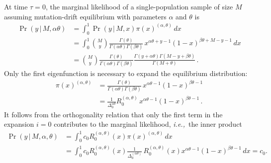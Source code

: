 \documentclass[preprint]{elsarticle}
\newcommand\given{{\,|\,}}
\newcommand\ie{{\it i.e.,}}
\begin{document}
At time $\tau=0$, the marginal likelihood of a single-population sample of size $M$ assuming mutation-drift equilibrium with parameters $\alpha$ and $\theta$ is
\begin{equation}
\begin{split}
    \Pr(y\given M,\alpha\theta)
    &=\int_0^1 \Pr(y\given M,x) \pi(x)^{(\alpha,\theta)}\,dx\\
    &=\int_0^1 \binom{M}{y}\frac{\Gamma(\theta)}{\Gamma(\alpha\theta)\Gamma(\beta\theta)}\,x^{\alpha\theta+y-1}(1-x)^{\beta\theta+M-y-1}\,dx\\
    &=\binom{M}{y}\frac{\Gamma(\theta)}{\Gamma(\alpha\theta)\Gamma(\beta\theta)}
    \frac{\Gamma(y+\alpha\theta)\Gamma(M-y+\beta\theta)}{\Gamma(M+\theta)}\,.
\end{split}
\end{equation}
Only the first eigenfunction is necessary to expand the equilibrium distribution:
\begin{equation}
\begin{split}
    \pi(x)^{(\alpha,\theta)}&=\frac{\Gamma(\theta)}{\Gamma(\alpha\theta)\Gamma(\beta\theta)}\,x^{\alpha\theta-1}(1-x)^{\beta\theta-1}\\
    &=\frac{1}{\Delta_0^{\alpha\theta}}R_0^{(\alpha,\theta)}\,x^{\alpha\theta-1}(1-x)^{\beta\theta-1}\,.
\end{split}
\end{equation}
It follows from the orthogonality relation that only the first term in the expansion $i=0$ contributes to the marginal likelihood, \ie\ the inner product
\begin{equation}
\begin{split}
    \Pr(y\given M,\alpha,\theta)&=\int_0^1 c_0 R_0^{(\alpha,\theta)}(x) \pi(x)^{(\alpha,\theta)}\,dx\\
    &=\int_0^1 c_0 R_0^{(\alpha,\theta)}(x) \frac{1}{\Delta_0^{(\alpha\theta)}}\,R_0^{(\alpha,\theta)}(x) x^{\alpha\theta-1}(1-x)^{\beta\theta-1}\,dx
    =c_0.
\end{split}
\end{equation}
\end{document}
